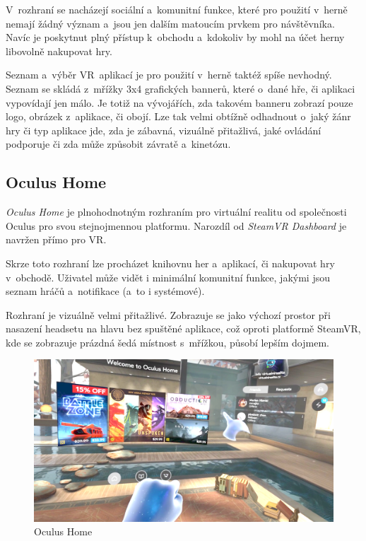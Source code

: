 V~rozhraní se nacházejí
sociální a~komunitní funkce, které pro použití v~herně nemají žádný
význam a~jsou jen dalším matoucím prvkem pro návštěvníka. Navíc je poskytnut
plný přístup k~obchodu a~kdokoliv by mohl na účet herny libovolně
nakupovat hry.

Seznam a~výběr VR~aplikací je pro použití v~herně taktéž spíše nevhodný.
Seznam se skládá z~mřížky 3x4 grafických bannerů, které o~dané hře, či aplikaci 
vypovídají jen málo. Je totiž na vývojářích, zda takovém banneru
zobrazí pouze logo, obrázek z~aplikace, či obojí. Lze tak velmi obtížně
odhadnout o~jaký žánr hry či typ aplikace jde, zda je zábavná, vizuálně přitažlivá, jaké
ovládání podporuje či zda může způsobit závratě a~kinetózu.

\subsection{Oculus Home}\label{oculus-home}

\emph{Oculus Home} je plnohodnotným rozhraním pro virtuální realitu od
společnosti Oculus pro svou stejnojmennou platformu. Narozdíl od
\emph{SteamVR Dashboard} je navržen přímo pro VR.

Skrze toto rozhraní lze procházet knihovnu her a~aplikací, či nakupovat hry
v~obchodě. Uživatel může vidět i minimální komunitní funkce, jakými jsou
seznam hráčů a~notifikace (a~to i systémové).

Rozhraní je vizuálně velmi přitažlivé. Zobrazuje se jako výchozí prostor
při nasazení headsetu na hlavu bez spuštěné aplikace, což oproti platformě
SteamVR, kde se zobrazuje prázdná šedá místnost s~mřížkou, působí lepším
dojmem.

\begin{figure}[h!]
\centering
\includegraphics[width=12cm]{src/assets/oculus-home.png}
\caption{Oculus Home}
\end{figure}

